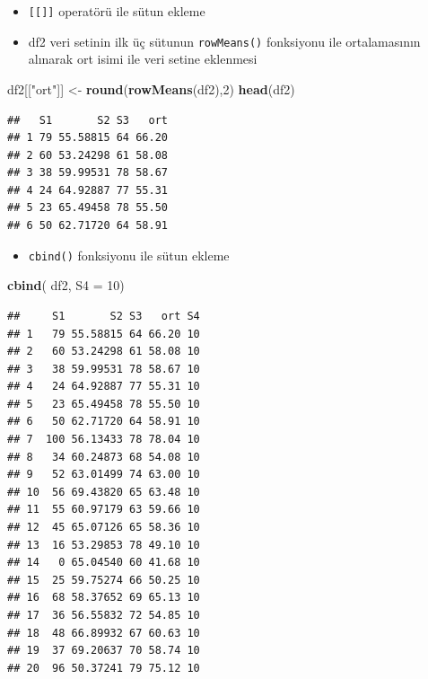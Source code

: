 \documentclass[
  oneside]{book}
\newenvironment{Shaded}{\begin{snugshade}}{\end{snugshade}}
\newcommand{\AttributeTok}[1]{\textcolor[rgb]{0.13,0.29,0.53}{#1}}
\newcommand{\DecValTok}[1]{\textcolor[rgb]{0.00,0.00,0.81}{#1}}
\newcommand{\FunctionTok}[1]{\textcolor[rgb]{0.13,0.29,0.53}{\textbf{#1}}}
\newcommand{\NormalTok}[1]{#1}
\newcommand{\OtherTok}[1]{\textcolor[rgb]{0.56,0.35,0.01}{#1}}
\newcommand{\StringTok}[1]{\textcolor[rgb]{0.31,0.60,0.02}{#1}}
\providecommand{\tightlist}{%
  \setlength{\itemsep}{0pt}\setlength{\parskip}{0pt}}
\begin{document}
\begin{itemize}
\item
  \texttt{{[}{[}{]}{]}} operatörü ile sütun ekleme
\item
  df2 veri setinin ilk üç sütunun \texttt{rowMeans()} fonksiyonu ile ortalamasının alınarak ort isimi ile veri setine eklenmesi
\end{itemize}

\begin{Shaded}
\begin{Highlighting}[]
\NormalTok{df2[[}\StringTok{"ort"}\NormalTok{]] }\OtherTok{\textless{}{-}} \FunctionTok{round}\NormalTok{(}\FunctionTok{rowMeans}\NormalTok{(df2),}\DecValTok{2}\NormalTok{)}
\FunctionTok{head}\NormalTok{(df2)}
\end{Highlighting}
\end{Shaded}

\begin{verbatim}
##   S1       S2 S3   ort
## 1 79 55.58815 64 66.20
## 2 60 53.24298 61 58.08
## 3 38 59.99531 78 58.67
## 4 24 64.92887 77 55.31
## 5 23 65.49458 78 55.50
## 6 50 62.71720 64 58.91
\end{verbatim}

\begin{itemize}
\tightlist
\item
  \texttt{cbind()} fonksiyonu ile sütun ekleme
\end{itemize}

\begin{Shaded}
\begin{Highlighting}[]
\FunctionTok{cbind}\NormalTok{( df2, }\AttributeTok{S4 =} \DecValTok{10}\NormalTok{)}
\end{Highlighting}
\end{Shaded}

\begin{verbatim}
##     S1       S2 S3   ort S4
## 1   79 55.58815 64 66.20 10
## 2   60 53.24298 61 58.08 10
## 3   38 59.99531 78 58.67 10
## 4   24 64.92887 77 55.31 10
## 5   23 65.49458 78 55.50 10
## 6   50 62.71720 64 58.91 10
## 7  100 56.13433 78 78.04 10
## 8   34 60.24873 68 54.08 10
## 9   52 63.01499 74 63.00 10
## 10  56 69.43820 65 63.48 10
## 11  55 60.97179 63 59.66 10
## 12  45 65.07126 65 58.36 10
## 13  16 53.29853 78 49.10 10
## 14   0 65.04540 60 41.68 10
## 15  25 59.75274 66 50.25 10
## 16  68 58.37652 69 65.13 10
## 17  36 56.55832 72 54.85 10
## 18  48 66.89932 67 60.63 10
## 19  37 69.20637 70 58.74 10
## 20  96 50.37241 79 75.12 10
\end{verbatim}
\end{document}
